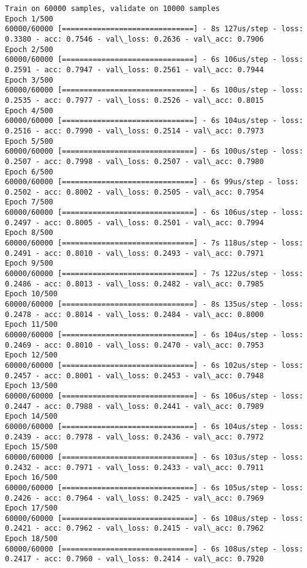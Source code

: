 \documentclass[11pt]{article}
\begin{document}
    \begin{Verbatim}[commandchars=\\\{\}]
Train on 60000 samples, validate on 10000 samples
Epoch 1/500
60000/60000 [==============================] - 8s 127us/step - loss: 0.3380 - acc: 0.7546 - val\_loss: 0.2636 - val\_acc: 0.7906
Epoch 2/500
60000/60000 [==============================] - 6s 106us/step - loss: 0.2591 - acc: 0.7947 - val\_loss: 0.2561 - val\_acc: 0.7944
Epoch 3/500
60000/60000 [==============================] - 6s 100us/step - loss: 0.2535 - acc: 0.7977 - val\_loss: 0.2526 - val\_acc: 0.8015
Epoch 4/500
60000/60000 [==============================] - 6s 104us/step - loss: 0.2516 - acc: 0.7990 - val\_loss: 0.2514 - val\_acc: 0.7973
Epoch 5/500
60000/60000 [==============================] - 6s 100us/step - loss: 0.2507 - acc: 0.7998 - val\_loss: 0.2507 - val\_acc: 0.7980
Epoch 6/500
60000/60000 [==============================] - 6s 99us/step - loss: 0.2502 - acc: 0.8002 - val\_loss: 0.2505 - val\_acc: 0.7954
Epoch 7/500
60000/60000 [==============================] - 6s 106us/step - loss: 0.2497 - acc: 0.8005 - val\_loss: 0.2501 - val\_acc: 0.7994
Epoch 8/500
60000/60000 [==============================] - 7s 118us/step - loss: 0.2491 - acc: 0.8010 - val\_loss: 0.2493 - val\_acc: 0.7971
Epoch 9/500
60000/60000 [==============================] - 7s 122us/step - loss: 0.2486 - acc: 0.8013 - val\_loss: 0.2482 - val\_acc: 0.7985
Epoch 10/500
60000/60000 [==============================] - 8s 135us/step - loss: 0.2478 - acc: 0.8014 - val\_loss: 0.2484 - val\_acc: 0.8000
Epoch 11/500
60000/60000 [==============================] - 6s 104us/step - loss: 0.2469 - acc: 0.8010 - val\_loss: 0.2470 - val\_acc: 0.7953
Epoch 12/500
60000/60000 [==============================] - 6s 102us/step - loss: 0.2457 - acc: 0.8001 - val\_loss: 0.2453 - val\_acc: 0.7948
Epoch 13/500
60000/60000 [==============================] - 6s 106us/step - loss: 0.2447 - acc: 0.7988 - val\_loss: 0.2441 - val\_acc: 0.7989
Epoch 14/500
60000/60000 [==============================] - 6s 104us/step - loss: 0.2439 - acc: 0.7978 - val\_loss: 0.2436 - val\_acc: 0.7972
Epoch 15/500
60000/60000 [==============================] - 6s 103us/step - loss: 0.2432 - acc: 0.7971 - val\_loss: 0.2433 - val\_acc: 0.7911
Epoch 16/500
60000/60000 [==============================] - 6s 105us/step - loss: 0.2426 - acc: 0.7964 - val\_loss: 0.2425 - val\_acc: 0.7969
Epoch 17/500
60000/60000 [==============================] - 6s 108us/step - loss: 0.2421 - acc: 0.7962 - val\_loss: 0.2415 - val\_acc: 0.7962
Epoch 18/500
60000/60000 [==============================] - 6s 108us/step - loss: 0.2417 - acc: 0.7960 - val\_loss: 0.2414 - val\_acc: 0.7920

\end{Verbatim}
\end{document}
